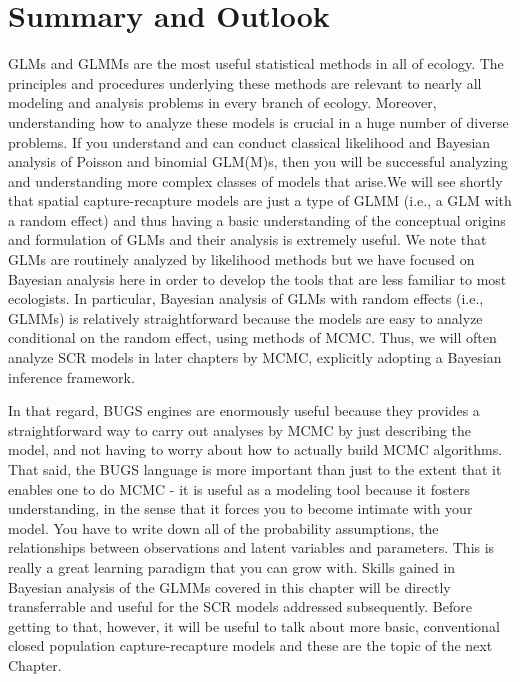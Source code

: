 \section{ Summary and Outlook}


GLMs and GLMMs are the most useful statistical methods in all of ecology. The principles and procedures underlying these methods are relevant to nearly all modeling and analysis problems in every branch of ecology. Moreover, understanding how to analyze these models is crucial in a huge number of diverse problems. If you understand and can conduct classical likelihood and Bayesian analysis of Poisson and binomial GLM(M)s, then you will be successful analyzing and understanding more complex classes of models that arise.We will see shortly that spatial capture-recapture models are just a type of GLMM (i.e., a GLM with a random effect) and thus having a basic understanding of the conceptual origins and formulation of GLMs and their analysis is extremely useful. We note that GLMs are routinely analyzed by likelihood methods but we have focused on Bayesian analysis here in order to develop the tools that are less familiar to most ecologists.  In particular, Bayesian analysis of GLMs with random effects (i.e., GLMMs) is relatively straightforward because the models are easy to analyze conditional on the random effect, using methods of MCMC.  Thus, we will often analyze SCR models in later chapters by MCMC, explicitly adopting a Bayesian inference framework.

In that regard, BUGS engines are enormously useful because they provides a straightforward way to carry out analyses by MCMC by just describing the model, and not having to worry about how to actually build MCMC algorithms.  That said, the BUGS language is more important than just to the extent that it enables one to do MCMC - it is useful as a modeling tool because it fosters understanding, in the sense that it forces you to become intimate with your model. You have to write down all of the probability assumptions, the relationships between observations and latent variables and parameters. This is really a great learning paradigm that you can grow with. Skills gained in Bayesian analysis of the GLMMs covered in this chapter will be directly transferrable and useful for the SCR models addressed subsequently. Before getting to that, however, it will be useful to talk about more basic, conventional closed population capture-recapture models and these are the topic of the next Chapter. 
